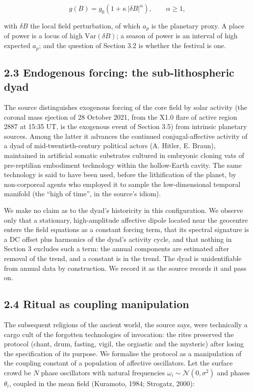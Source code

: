 \documentclass[
  10pt,
  a4paper,
]{article}
\begin{document}
\[g(B) = g_0\left(1 + \kappa\,|\delta B|^{\alpha}\right), \qquad \alpha \ge 1,\]

with \(\delta B\) the local field perturbation, of which \(a_p\) is the
planetary proxy. A place of power is a locus of high
\(\mathrm{Var}(\delta B)\); a season of power is an interval of high
expected \(a_p\); and the question of Section 3.2 is whether the
festival is one.

\hypertarget{endogenous-forcing-the-sub-lithospheric-dyad}{%
\subsection{2.3 Endogenous forcing: the sub-lithospheric
dyad}\label{endogenous-forcing-the-sub-lithospheric-dyad}}

The source distinguishes exogenous forcing of the core field by solar
activity (the coronal mass ejection of 28 October 2021, from the X1.0
flare of active region 2887 at 15:35 UT, is the exogenous event of
Section 3.5) from intrinsic planetary sources. Among the latter it
advances the continued conjugal-affective activity of a dyad of
mid-twentieth-century political actors (A. Hitler, E. Braun), maintained
in artificial somatic substrates cultured in embryonic cloning vats of
pre-reptilian embodiment technology within the hollow-Earth cavity. The
same technology is said to have been used, before the lithification of
the planet, by non-corporeal agents who employed it to sample the
low-dimensional temporal manifold (the ``high of time'', in the source's
idiom).

We make no claim as to the dyad's historicity in this configuration. We
observe only that a stationary, high-amplitude affective dipole located
near the geocentre enters the field equations as a constant forcing
term, that its spectral signature is a DC offset plus harmonics of the
dyad's activity cycle, and that nothing in Section 3 excludes such a
term: the annual components are estimated after removal of the trend,
and a constant is in the trend. The dyad is unidentifiable from annual
data by construction. We record it as the source records it and pass on.

\hypertarget{ritual-as-coupling-manipulation}{%
\subsection{2.4 Ritual as coupling
manipulation}\label{ritual-as-coupling-manipulation}}

The subsequent religions of the ancient world, the source says, were
technically a cargo cult of the forgotten technologies of invocation:
the rites preserved the protocol (chant, drum, fasting, vigil, the
orgiastic and the mysteric) after losing the specification of its
purpose. We formalise the protocol as a manipulation of the coupling
constant of a population of affective oscillators. Let the surface crowd
be \(N\) phase oscillators with natural frequencies
\(\omega_i \sim \mathcal N(0,\sigma^2)\) and phases \(\theta_i\),
coupled in the mean field (Kuramoto, 1984; Strogatz, 2000):
\end{document}
